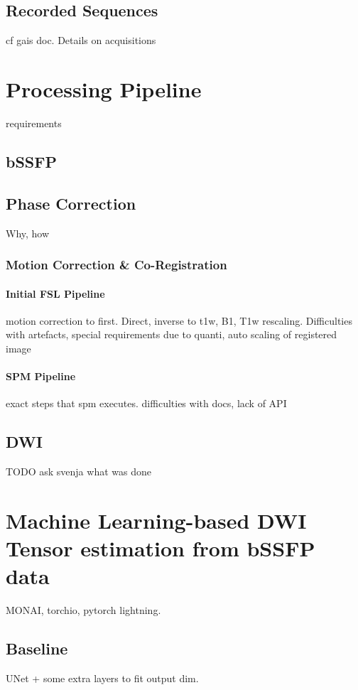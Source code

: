 \subsection{Recorded Sequences}
cf gais doc.
Details on acquisitions

\section{Processing Pipeline}
requirements
\subsection{bSSFP}
\subsection{Phase Correction}
Why, how

\subsubsection{Motion Correction \& Co-Registration}
\paragraph{Initial FSL Pipeline} motion correction to first. Direct, inverse to t1w, B1, T1w rescaling. Difficulties with artefacts, special requirements due to quanti, auto scaling of registered image

\paragraph{SPM Pipeline} exact steps that spm executes. difficulties with docs, lack of API


\subsection{DWI}
TODO ask svenja what was done


\section{Machine Learning-based DWI Tensor estimation from bSSFP data}
MONAI, torchio, pytorch lightning. 

\subsection{Baseline}
UNet + some extra layers to fit output dim. 

